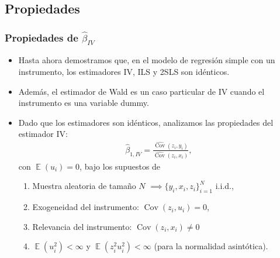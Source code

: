 \documentclass[t, compress, spanish, aspectratio=169]{beamer}
\DeclareMathOperator{\Cov}{Cov}
\DeclareMathOperator{\E}{\mathbb{E}}
\begin{document}
\subsection{Propiedades}
\begin{frame}
    \frametitle{Propiedades de $\hat \beta_{IV}$}
    \vspace*{-0.6em}
    \small
    \begin{itemize}
        \item  <1->Hasta ahora demostramos que, en el modelo de regresi\'on simple con un instrumento, los estimadores IV, ILS y 2SLS son id\'enticos.
        \item  <1-> Adem\'as, el estimador de Wald es un caso particular de IV cuando el instrumento es una variable dummy.
        \item  <2->Dado que los estimadores son id\'enticos, analizamos las propiedades del estimador IV:
        \begin{align*}
            \hat \beta_{1,IV} =\frac{\widehat{\Cov}(z_i,y_i)}{\widehat{\Cov}(z_i,x_i)},
        \end{align*}
        con $\E(u_i)=0$, bajo los supuestos de
    \begin{enumerate}\small
        \item [IV1]  Muestra aleatoria de tama\~no $N$ $\implies \{y_i,x_i,z_i\}_{i=1}^N$ i.i.d.,
        \item [IV2]  Exogeneidad del instrumento: $\Cov(z_i,u_i)=0$,
        \item [IV3]  Relevancia del instrumento: $\Cov(z_i,x_i)\neq 0$
        \item [IV4]  $\E(u_i^2)<\infty$ y $\E(z_i^2u_i^2)<\infty$ (para la normalidad asint\'otica).
    \end{enumerate}
        \end{itemize}
\end{frame}

%
\end{document}

